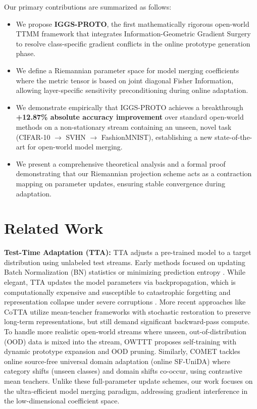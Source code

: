 \documentclass{article}
\theoremstyle{plain}
\theoremstyle{definition}
\theoremstyle{remark}
\begin{document}
Our primary contributions are summarized as follows:
\begin{itemize}
    \item We propose \textbf{IGGS-PROTO}, the first mathematically rigorous open-world TTMM framework that integrates Information-Geometric Gradient Surgery to resolve class-specific gradient conflicts in the online prototype generation phase.
    \item We define a Riemannian parameter space for model merging coefficients where the metric tensor is based on joint diagonal Fisher Information, allowing layer-specific sensitivity preconditioning during online adaptation.
    \item We demonstrate empirically that IGGS-PROTO achieves a breakthrough \textbf{+12.87\% absolute accuracy improvement} over standard open-world methods on a non-stationary stream containing an unseen, novel task (CIFAR-10 $\to$ SVHN $\to$ FashionMNIST), establishing a new state-of-the-art for open-world model merging.
    \item We present a comprehensive theoretical analysis and a formal proof demonstrating that our Riemannian projection scheme acts as a contraction mapping on parameter updates, ensuring stable convergence during adaptation.
\end{itemize}

\section{Related Work}
\label{submission-sec2}
\textbf{Test-Time Adaptation (TTA):} TTA adjusts a pre-trained model to a target distribution using unlabeled test streams. Early methods focused on updating Batch Normalization (BN) statistics \cite{li2016, schneider2020} or minimizing prediction entropy \cite{wang2021b}. While elegant, TTA updates the model parameters via backpropagation, which is computationally expensive and susceptible to catastrophic forgetting and representation collapse under severe corruptions \cite{gong2022, dobler2023}. More recent approaches like CoTTA \cite{wang2022b} utilize mean-teacher frameworks with stochastic restoration to preserve long-term representations, but still demand significant backward-pass compute. To handle more realistic open-world streams where unseen, out-of-distribution (OOD) data is mixed into the stream, OWTTT \cite{li2023robustness} proposes self-training with dynamic prototype expansion and OOD pruning. Similarly, COMET \cite{schlachter2024comet} tackles online source-free universal domain adaptation (online SF-UniDA) where category shifts (unseen classes) and domain shifts co-occur, using contrastive mean teachers. Unlike these full-parameter update schemes, our work focuses on the ultra-efficient model merging paradigm, addressing gradient interference in the low-dimensional coefficient space.
\end{document}
